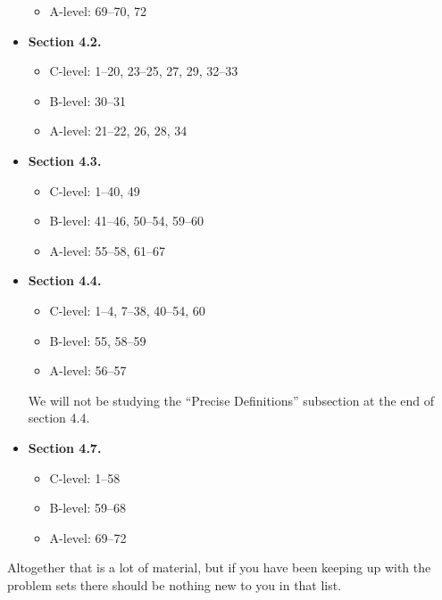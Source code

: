 \documentclass[11pt]{article}
\begin{document}
\begin{itemize}
\begin{itemize}
      \item A-level: 69--70, 72
      \end{itemize}
 \item \textbf{Section 4.2.}
 \begin{itemize}
  \item C-level: 1--20, 23--25, 27, 29, 32--33
    \item B-level: 30--31
      \item A-level: 21--22, 26, 28, 34
      \end{itemize}
\item \textbf{Section 4.3.}
\begin{itemize}
  \item C-level: 1--40, 49
    \item B-level: 41--46, 50--54, 59--60
      \item A-level: 55--58, 61--67
      \end{itemize}
\item \textbf{Section 4.4.}
  \begin{itemize}
    \item C-level: 1--4, 7--38, 40--54, 60
      \item B-level: 55, 58--59
        \item A-level: 56--57
	  \end{itemize}
	    We will not be studying the ``Precise Definitions'' subsection
	      at the end of section 4.4.
\item \textbf{Section 4.7.}
  \begin{itemize}
    \item C-level: 1--58
      \item B-level: 59--68
        \item A-level: 69--72
	  \end{itemize}
\end{itemize}
Altogether that is a lot of material, but if you have been keeping up
with the problem sets there should be nothing new to you in that list.
\end{document}
